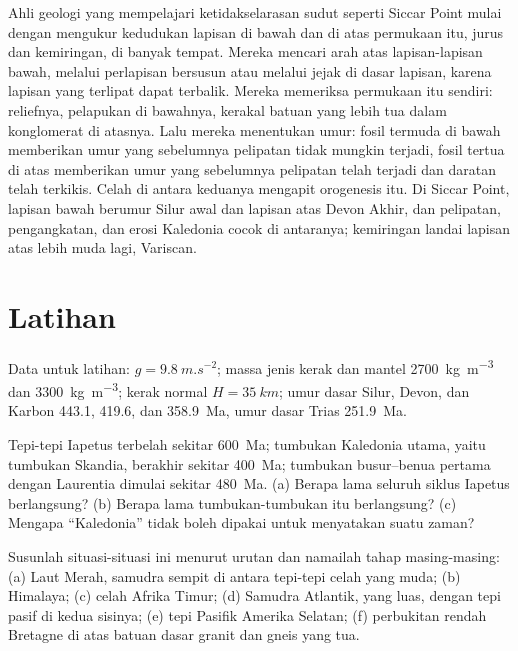 \begin{inthefield}
Ahli geologi yang mempelajari ketidakselarasan sudut seperti Siccar Point mulai dengan mengukur
kedudukan lapisan di bawah dan di atas permukaan itu, jurus dan kemiringan, di banyak tempat. Mereka mencari
arah atas lapisan-lapisan bawah, melalui perlapisan bersusun atau melalui jejak di dasar lapisan,
karena lapisan yang terlipat dapat terbalik. Mereka memeriksa permukaan itu sendiri: reliefnya,
pelapukan di bawahnya, kerakal batuan yang lebih tua dalam konglomerat di atasnya. Lalu mereka
menentukan umur: fosil termuda di bawah memberikan umur yang sebelumnya pelipatan tidak mungkin terjadi,
fosil tertua di atas memberikan umur yang sebelumnya pelipatan telah terjadi dan daratan telah terkikis.
Celah di antara keduanya mengapit orogenesis itu. Di Siccar Point, lapisan bawah berumur Silur
awal dan lapisan atas Devon Akhir, dan pelipatan, pengangkatan, dan erosi Kaledonia cocok
di antaranya; kemiringan landai lapisan atas lebih muda lagi, Variscan.
\end{inthefield}

\section*{Latihan}\label{sec:b2:wilson-cycle:exercises}

Data untuk latihan: $g = \qty{9.8}{m.s^{-2}}$; massa jenis kerak dan mantel
\qty{2700}{kg.m^{-3}} dan \qty{3300}{kg.m^{-3}}; kerak normal $H = \qty{35}{km}$; umur
dasar Silur, Devon, dan Karbon 443.1, 419.6, dan \qty{358.9}{Ma}, umur dasar
Trias \qty{251.9}{Ma}.

\begin{exercise}[$\star$]\label{exo:b2:wilson-cycle:1}
Tepi-tepi Iapetus terbelah sekitar \qty{600}{Ma}; tumbukan Kaledonia utama, yaitu
tumbukan Skandia, berakhir sekitar \qty{400}{Ma}; tumbukan busur--benua pertama dengan Laurentia dimulai
sekitar \qty{480}{Ma}. (a) Berapa lama seluruh siklus Iapetus berlangsung? (b) Berapa lama
tumbukan-tumbukan itu berlangsung? (c) Mengapa ``Kaledonia'' tidak boleh dipakai untuk menyatakan suatu zaman?
\end{exercise}

\begin{exercise}[$\star$]\label{exo:b2:wilson-cycle:2}
Susunlah situasi-situasi ini menurut urutan  dan namailah tahap masing-masing: (a)
Laut Merah, samudra sempit di antara tepi-tepi celah yang muda; (b) Himalaya; (c) celah Afrika
Timur; (d) Samudra Atlantik, yang luas, dengan tepi pasif di kedua sisinya; (e) tepi Pasifik
Amerika Selatan; (f) perbukitan rendah Bretagne di atas batuan dasar granit dan gneis yang tua.
\end{exercise}

